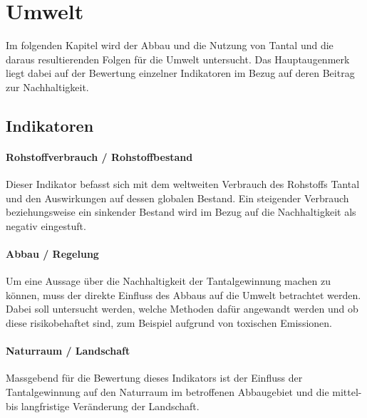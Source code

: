 \section{Umwelt}\label{sec:solutions}

Im folgenden Kapitel wird der Abbau und die Nutzung von
Tantal und die daraus resultierenden Folgen für die Umwelt untersucht.
Das Hauptaugenmerk liegt dabei auf der Bewertung einzelner Indikatoren im Bezug
auf deren Beitrag zur Nachhaltigkeit.
\subsection{Indikatoren}

\paragraph{Rohstoffverbrauch / Rohstoffbestand}
Dieser Indikator befasst sich mit dem weltweiten Verbrauch des Rohstoffs
Tantal und den Auswirkungen auf dessen globalen Bestand. Ein steigender
Verbrauch beziehungsweise ein sinkender Bestand wird im Bezug auf die
Nachhaltigkeit als negativ eingestuft.

\paragraph{Abbau / Regelung}
Um eine Aussage über die Nachhaltigkeit der Tantalgewinnung machen zu können,
muss der direkte Einfluss des Abbaus auf die Umwelt betrachtet werden. Dabei
soll untersucht werden, welche Methoden dafür angewandt werden und ob diese
risikobehaftet sind, zum Beispiel aufgrund von toxischen Emissionen.

\paragraph{Naturraum / Landschaft}
Massgebend für die Bewertung dieses Indikators ist der Einfluss der
Tantalgewinnung auf den Naturraum im betroffenen Abbaugebiet und die mittel- bis
langfristige Veränderung der Landschaft.

